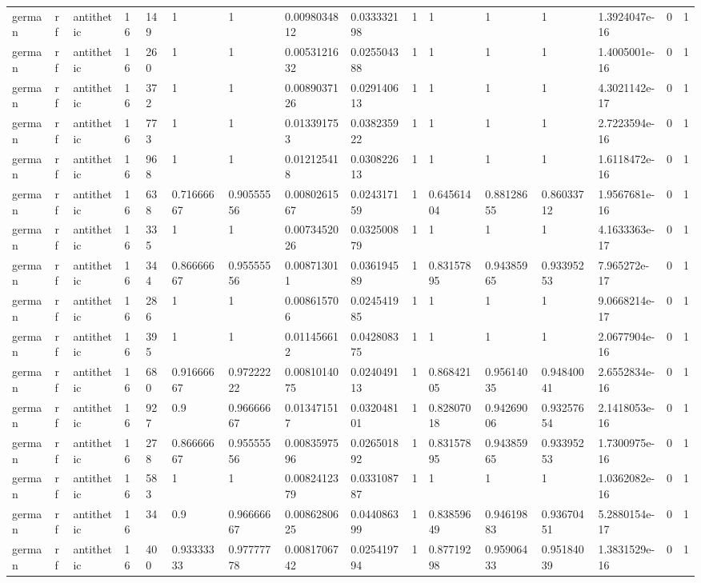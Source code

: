\begin{tabular}{llllllllllllllll}
german & rf & antithetic & 16 & 149 & 1 & 1 & 0.0098034812 & 0.033332198 & 1 & 1 & 1 & 1 & 1.3924047e-16 & 0 & 1 \\
german & rf & antithetic & 16 & 260 & 1 & 1 & 0.0053121632 & 0.025504388 & 1 & 1 & 1 & 1 & 1.4005001e-16 & 0 & 1 \\
german & rf & antithetic & 16 & 372 & 1 & 1 & 0.0089037126 & 0.029140613 & 1 & 1 & 1 & 1 & 4.3021142e-17 & 0 & 1 \\
german & rf & antithetic & 16 & 773 & 1 & 1 & 0.013391753 & 0.038235922 & 1 & 1 & 1 & 1 & 2.7223594e-16 & 0 & 1 \\
german & rf & antithetic & 16 & 968 & 1 & 1 & 0.012125418 & 0.030822613 & 1 & 1 & 1 & 1 & 1.6118472e-16 & 0 & 1 \\
german & rf & antithetic & 16 & 638 & 0.71666667 & 0.90555556 & 0.0080261567 & 0.024317159 & 1 & 0.64561404 & 0.88128655 & 0.86033712 & 1.9567681e-16 & 0 & 1 \\
german & rf & antithetic & 16 & 335 & 1 & 1 & 0.0073452026 & 0.032500879 & 1 & 1 & 1 & 1 & 4.1633363e-17 & 0 & 1 \\
german & rf & antithetic & 16 & 344 & 0.86666667 & 0.95555556 & 0.008713011 & 0.036194589 & 1 & 0.83157895 & 0.94385965 & 0.93395253 & 7.965272e-17 & 0 & 1 \\
german & rf & antithetic & 16 & 286 & 1 & 1 & 0.008615706 & 0.024541985 & 1 & 1 & 1 & 1 & 9.0668214e-17 & 0 & 1 \\
german & rf & antithetic & 16 & 395 & 1 & 1 & 0.011456612 & 0.042808375 & 1 & 1 & 1 & 1 & 2.0677904e-16 & 0 & 1 \\
german & rf & antithetic & 16 & 680 & 0.91666667 & 0.97222222 & 0.0081014075 & 0.024049113 & 1 & 0.86842105 & 0.95614035 & 0.94840041 & 2.6552834e-16 & 0 & 1 \\
german & rf & antithetic & 16 & 927 & 0.9 & 0.96666667 & 0.013471517 & 0.032048101 & 1 & 0.82807018 & 0.94269006 & 0.93257654 & 2.1418053e-16 & 0 & 1 \\
german & rf & antithetic & 16 & 278 & 0.86666667 & 0.95555556 & 0.0083597596 & 0.026501892 & 1 & 0.83157895 & 0.94385965 & 0.93395253 & 1.7300975e-16 & 0 & 1 \\
german & rf & antithetic & 16 & 583 & 1 & 1 & 0.0082412379 & 0.033108787 & 1 & 1 & 1 & 1 & 1.0362082e-16 & 0 & 1 \\
german & rf & antithetic & 16 & 34 & 0.9 & 0.96666667 & 0.0086280625 & 0.044086399 & 1 & 0.83859649 & 0.94619883 & 0.93670451 & 5.2880154e-17 & 0 & 1 \\
german & rf & antithetic & 16 & 400 & 0.93333333 & 0.97777778 & 0.0081706742 & 0.025419794 & 1 & 0.87719298 & 0.95906433 & 0.95184039 & 1.3831529e-16 & 0 & 1 \\

\end{tabular}
